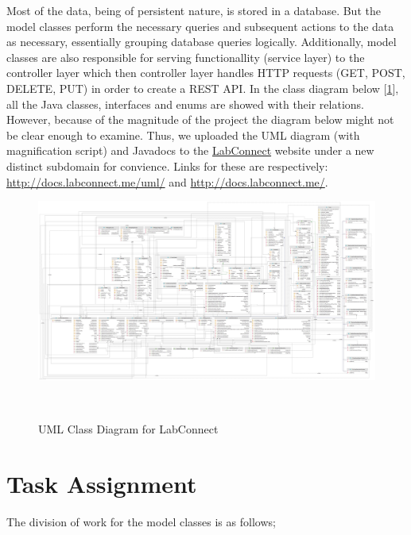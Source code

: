 \documentclass[a4paper, 12pt]{article}
\begin{document}
    Most of the data, being of persistent nature, is stored in a database. But the model classes
    perform the necessary queries and subsequent actions to the data as necessary,
    essentially grouping database queries logically. Additionally, model classes are also responsible for serving
    functionallity (service layer) to the controller layer which then controller layer handles HTTP requests (GET, POST, DELETE, PUT) in order
    to create a REST API. In the class diagram below [\ref{fig:class-diagram}], all the Java classes,
    interfaces and enums are showed with their relations. However, because of the magnitude of the project
    the diagram below might not be clear enough to examine. Thus, we uploaded the UML diagram
    (with magnification script) and Javadocs to the \href{http://www.labconnect.me}{LabConnect} website under a new distinct subdomain for convience.
    Links for these are respectively: \href{http://docs.labconnect.me/uml/}{http://docs.labconnect.me/uml/}
    and \href{http://docs.labconnect.me/}{http://docs.labconnect.me/}.

    \begin{figure}[H]
        \centering
        \includegraphics[width=\textwidth]{UML.jpg}
        \caption{UML Class Diagram for LabConnect}~\label{fig:class-diagram}
    \end{figure}

    \pagebreak


    \section{Task Assignment}

    The division of work for the model classes is as follows;
\end{document}
